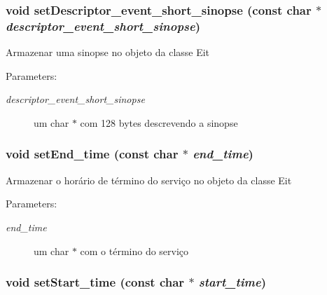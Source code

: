 \subsubsection{\setlength{\rightskip}{0pt plus 5cm}void setDescriptor\_\-event\_\-short\_\-sinopse (const char $\ast$ {\em descriptor\_\-event\_\-short\_\-sinopse})}\label{classbr_1_1ufscar_1_1lince_1_1ginga_1_1recommender_1_1eit_d3ede0fbd0906585803f04ad91303a71}


Armazenar uma sinopse no objeto da classe Eit \begin{Desc}
\item[Parameters:]
\begin{description}
\item[{\em descriptor\_\-event\_\-short\_\-sinopse}]um char $\ast$ com 128 bytes descrevendo a sinopse \end{description}
\end{Desc}
\subsubsection{\setlength{\rightskip}{0pt plus 5cm}void setEnd\_\-time (const char $\ast$ {\em end\_\-time})}\label{classbr_1_1ufscar_1_1lince_1_1ginga_1_1recommender_1_1eit_3daf217c6a67cd2b57c00fe2c6e9ad47}


Armazenar o horário de término do serviço no objeto da classe Eit \begin{Desc}
\item[Parameters:]
\begin{description}
\item[{\em end\_\-time}]um char $\ast$ com o término do serviço \end{description}
\end{Desc}
\subsubsection{\setlength{\rightskip}{0pt plus 5cm}void setStart\_\-time (const char $\ast$ {\em start\_\-time})}\label{classbr_1_1ufscar_1_1lince_1_1ginga_1_1recommender_1_1eit_cc5f5fddad17cb83bb9923c2c96411be}


